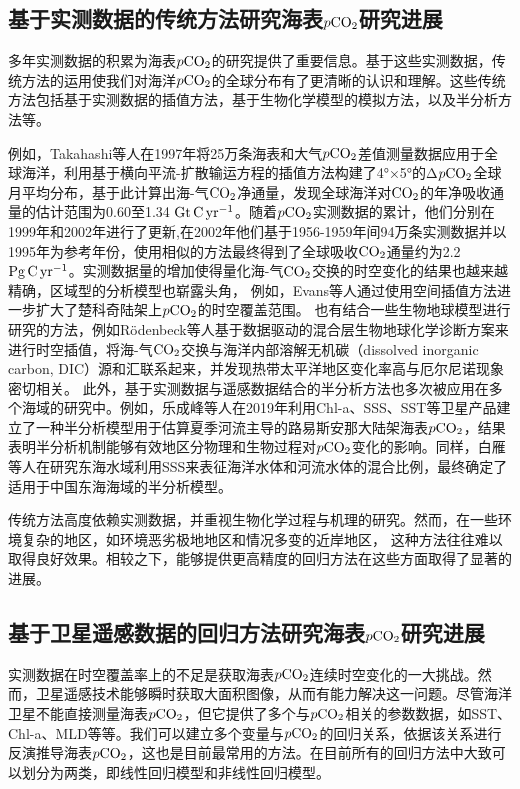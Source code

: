 \subsection{基于实测数据的传统方法研究海表\texorpdfstring{$p\rm CO_2$}{}研究进展}
多年实测数据的积累为海表$p\rm CO_2$的研究提供了重要信息。基于这些实测数据，传统方法的运用使我们对海洋$p\rm CO_2$的全球分布有了更清晰的认识和理解。这些传统方法包括基于实测数据的插值方法\cite{takahashi1997global,takahashi1999net,takahashi2002global}，基于生物化学模型的模拟方法\cite{rodenbeck2014interannual}，以及半分析方法\cite{le2019estimating,bai2015mechanistic,chen2017estimating}等。

例如，Takahashi等人\cite{takahashi1997global}在1997年将25万条海表和大气$p\rm CO_2$差值测量数据应用于全球海洋，利用基于横向平流-扩散输运方程的插值方法构建了4°×5°的Δ$p\rm CO_2$全球月平均分布，基于此计算出海-气$\rm CO_2$净通量，发现全球海洋对$\rm CO_2$的年净吸收通量的估计范围为0.60至1.34 $\rm Gt \, C\, yr^{-1}$。随着$p\rm CO_2$实测数据的累计，他们分别在1999年\cite{takahashi1999net}和2002年\cite{takahashi2002global}进行了更新,在2002年\cite{takahashi2002global}他们基于1956-1959年间94万条实测数据并以1995年为参考年份，使用相似的方法最终得到了全球吸收$\rm CO_2$通量约为2.2$\rm Pg\, C\, yr^{-1}$。实测数据量的增加使得量化海-气$\rm CO_2$交换的时空变化的结果也越来越精确，区域型的分析模型也崭露头角，
例如，Evans等人\cite{evans2015sea}通过使用空间插值方法进一步扩大了楚科奇陆架上$p\rm CO_2$的时空覆盖范围。
也有结合一些生物地球模型进行研究的方法，例如Rödenbeck等人\cite{rodenbeck2014interannual}基于数据驱动的混合层生物地球化学诊断方案来进行时空插值，将海-气$\rm CO_2$交换与海洋内部溶解无机碳（dissolved inorganic carbon, DIC）源和汇联系起来，并发现热带太平洋地区变化率高与厄尔尼诺现象密切相关。
此外，基于实测数据与遥感数据结合的半分析方法也多次被应用在多个海域的研究中。例如，乐成峰等人\cite{le2019estimating}在2019年利用Chl-a、SSS、SST等卫星产品建立了一种半分析模型用于估算夏季河流主导的路易斯安那大陆架海表$p\rm CO_2$，结果表明半分析机制能够有效地区分物理和生物过程对$p\rm CO_2$变化的影响。同样，白雁等人\cite{bai2015mechanistic}在研究东海水域利用SSS来表征海洋水体和河流水体的混合比例，最终确定了适用于中国东海海域的半分析模型。

传统方法高度依赖实测数据，并重视生物化学过程与机理的研究。然而，在一些环境复杂的地区，如环境恶劣极地地区和情况多变的近岸地区，
这种方法往往难以取得良好效果。相较之下，能够提供更高精度的回归方法在这些方面取得了显著的进展。

\subsection{基于卫星遥感数据的回归方法研究海表\texorpdfstring{$p\rm CO_2$}{}研究进展}
实测数据在时空覆盖率上的不足是获取海表$p\rm CO_2$连续时空变化的一大挑战。然而，卫星遥感技术能够瞬时获取大面积图像，从而有能力解决这一问题。尽管海洋卫星不能直接测量海表$p\rm CO_2$，但它提供了多个与$p\rm CO_2$相关的参数数据，如SST、Chl-a、MLD等等。我们可以建立多个变量与$p\rm CO_2$的回归关系，依据该关系进行反演推导海表$p\rm CO_2$，这也是目前最常用的方法。在目前所有的回归方法中大致可以划分为两类，即线性回归模型和非线性回归模型。


